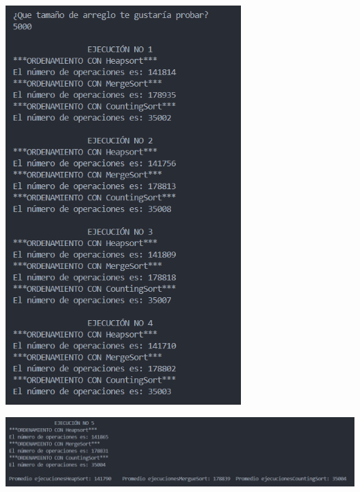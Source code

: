 \documentclass[12pt]{article}
\begin{document}
\includegraphics[width=9cm]{Images/Tam.5000/1.png}
\par\vspace{0.4cm}
\includegraphics[width=16cm]{Images/Tam.5000/2.png}
\par\vspace{0.4cm}
\end{document}
